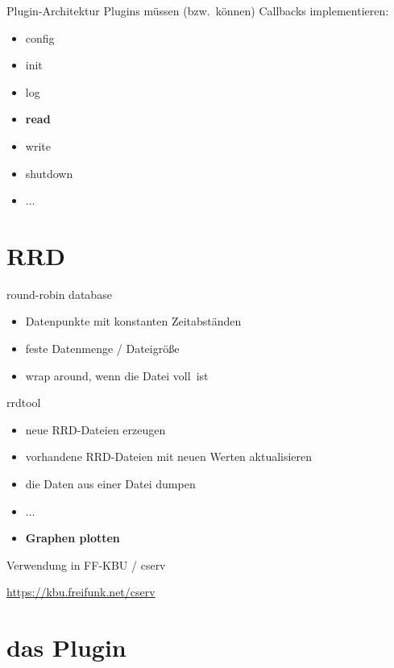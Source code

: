 \documentclass[ngerman,compress,aspectratio=169]{beamer}
\begin{document}
\begin{frame}{Plugin-Architektur}
	Plugins m\"ussen (bzw.\ k\"onnen) Callbacks implementieren:
	\begin{itemize}
		\pause
		\item config
		\pause
		\item init
		\pause
		\item log
		\pause
		\item \textbf{read}
		\pause
		\item write
		\pause
		\item shutdown
		\pause
		\item $\ldots$
	\end{itemize}
\end{frame}

\section{RRD}

\begin{frame}{round-robin database}
	\begin{itemize}
		\pause
		\item Datenpunkte mit konstanten Zeitabst\"anden
		\pause
		\item feste Datenmenge / Dateigr\"o\ss e
		\pause
		\item \glqq wrap around\grqq, wenn die Datei \glqq voll\grqq\ ist
		\pause
	\end{itemize}
\end{frame}

\begin{frame}{rrdtool}
	\begin{itemize}
		\pause
		\item neue RRD-Dateien erzeugen
		\pause
		\item vorhandene RRD-Dateien mit neuen Werten aktualisieren
		\pause
		\item die Daten aus einer Datei dumpen
		\pause
		\item $\ldots$
		\pause
		\item \textbf{Graphen plotten}
	\end{itemize}
\end{frame}

\begin{frame}{Verwendung in FF-KBU / cserv}
	\begin{center}
		\url{https://kbu.freifunk.net/cserv}
	\end{center}
\end{frame}

\section{das Plugin}
\end{document}
